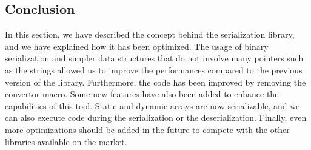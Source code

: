 \subsection{Conclusion}

In this section, we have described the concept behind the serialization library,
and we have explained how it has been optimized. The usage of binary
serialization and simpler data structures that do not involve many pointers such
as the strings allowed us to improve the performances compared to the previous
version of the library. Furthermore, the code has been improved by removing the
convertor macro. Some new features have also been added to enhance the
capabilities of this tool. Static and dynamic arrays are now serializable, and
we can also execute code during the serialization or the deserialization.
Finally, even more optimizations should be added in the future to compete with
the other libraries available on the market.
